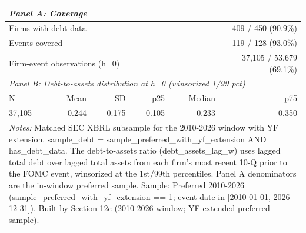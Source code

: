 \begin{tabular}{l r r r r r}
\toprule
\multicolumn{6}{l}{\textit{Panel A: Coverage}} \\
\midrule
\multicolumn{5}{l}{Firms with debt data} & 409 / 450 (90.9\%) \\
\multicolumn{5}{l}{Events covered} & 119 / 128 (93.0\%) \\
\multicolumn{5}{l}{Firm-event observations (h=0)} & 37,105 / 53,679 (69.1\%) \\
\midrule
\multicolumn{6}{l}{\textit{Panel B: Debt-to-assets distribution at h=0 (winsorized 1/99 pct)}} \\
\midrule
N & Mean & SD & p25 & Median & p75 \\
\midrule
37,105 & 0.244 & 0.175 & 0.105 & 0.233 & 0.350 \\
\bottomrule
\multicolumn{6}{p{\linewidth}}{\footnotesize \textit{Notes:} Matched SEC XBRL subsample for the 2010-2026 window with YF extension. sample\_debt = sample\_preferred\_with\_yf\_extension AND has\_debt\_data. The debt-to-assets ratio (debt\_assets\_lag\_w) uses lagged total debt over lagged total assets from each firm's most recent 10-Q prior to the FOMC event, winsorized at the 1st/99th percentiles. Panel A denominators are the in-window preferred sample. Sample: Preferred 2010-2026 (sample\_preferred\_with\_yf\_extension == 1; event date in [2010-01-01, 2026-12-31]). Built by Section 12c (2010-2026 window; YF-extended preferred sample).} \\
\end{tabular}
